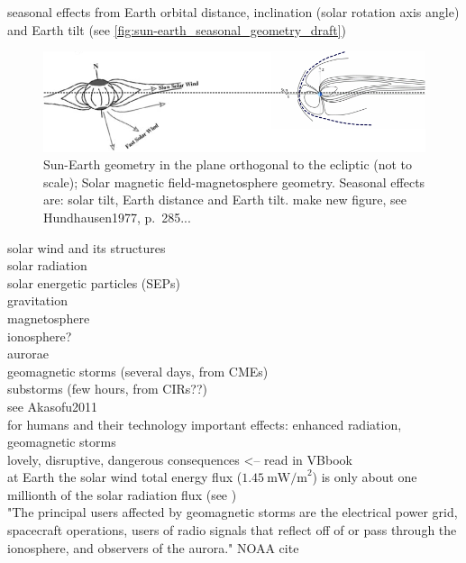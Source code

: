 seasonal effects from Earth orbital distance, inclination (solar rotation axis angle) and Earth tilt (see \autoref{fig:sun-earth_seasonal_geometry_draft})\\
\begin{figure}[htb]
	\centering
	\includegraphics[width=\textwidth]{figures_of_mine/schemata/sun-earth_seasonal_geometry_draft.png}
	\caption{Sun-Earth geometry in the plane orthogonal to the ecliptic (not to scale); Solar magnetic field-magnetosphere geometry. Seasonal effects are: solar tilt, Earth distance and Earth tilt. make new figure, see Hundhausen1977, p.~285...}
	\label{fig:sun-earth_seasonal_geometry_draft}
\end{figure}

solar wind and its structures\\
solar radiation\\
solar energetic particles (SEPs)\\
gravitation\\

magnetosphere\\
ionosphere?\\
aurorae\\
geomagnetic storms (several days, from CMEs)\\
substorms (few hours, from CIRs??)\\

see Akasofu2011\\

for humans and their technology important effects: enhanced radiation, geomagnetic storms\\
lovely, disruptive, dangerous consequences <-- read in VBbook\\

at Earth the solar wind total energy flux ($1.45~\text{mW/m}^2$) is only about one millionth of the solar radiation flux (see \citet[p.~153]{Schwenn1990})\\

"The principal users affected by geomagnetic storms are the electrical power grid, spacecraft operations, users of radio signals that reflect off of or pass through the ionosphere, and observers of the aurora." NOAA cite\\



